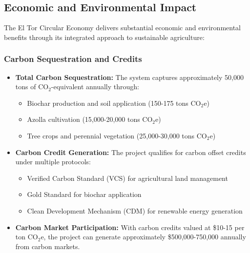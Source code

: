 \subsection{Economic and Environmental Impact}

The El Tor Circular Economy delivers substantial economic and environmental benefits through its integrated approach to sustainable agriculture:

\subsubsection{Carbon Sequestration and Credits}
\begin{itemize}
    \item \textbf{Total Carbon Sequestration:} The system captures approximately 50,000 tons of CO$_2$-equivalent annually through:
    \begin{itemize}
        \item Biochar production and soil application (150-175 tons CO$_2$e)
        \item Azolla cultivation (15,000-20,000 tons CO$_2$e)
        \item Tree crops and perennial vegetation (25,000-30,000 tons CO$_2$e)
    \end{itemize}
    
    \item \textbf{Carbon Credit Generation:} The project qualifies for carbon offset credits under multiple protocols:
    \begin{itemize}
        \item Verified Carbon Standard (VCS) for agricultural land management
        \item Gold Standard for biochar application
        \item Clean Development Mechanism (CDM) for renewable energy generation
    \end{itemize}
    
    \item \textbf{Carbon Market Participation:} With carbon credits valued at \$10-15 per ton CO$_2$e, the project can generate approximately \$500,000-750,000 annually from carbon markets.
\end{itemize}

